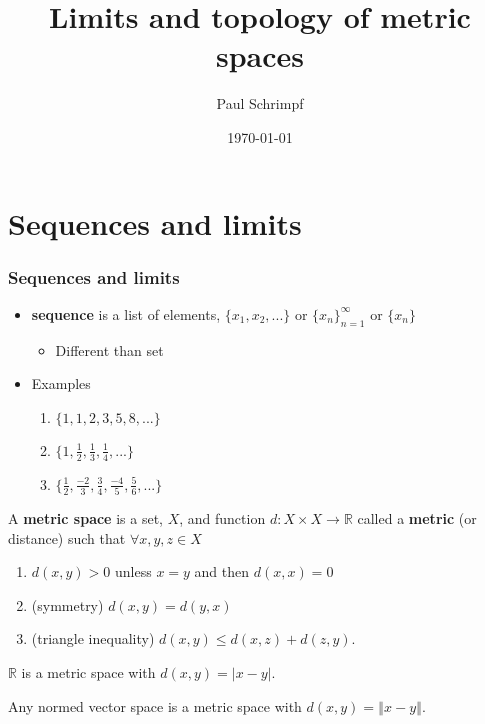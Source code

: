 \documentclass[compress]{beamer}
\title{Limits and topology of metric spaces}
\author{Paul Schrimpf}
\institute{UBC \\ Economics 526}
\date{\today}
\def\R{\mathbb{R}}
\newcommand{\norm}[1]{\left\Vert {#1} \right\Vert}
\newcommand{\seq}[1]{\{{#1}_n \}_{n=1}^\infty }
\begin{document}
\frame{\titlepage}

\begin{frame}
  \tableofcontents  
\end{frame}

\section{Sequences and limits}

\begin{frame}
  \frametitle{Sequences and limits}
  \begin{itemize}
  \item \textbf{sequence} is a list of elements, $\{x_1, x_2, ... \}$ or
    $\seq{x}$ or  $\{x_n\}$
    \begin{itemize}
    \item Different than set
    \end{itemize}
  \item Examples
    \begin{enumerate}
    \item\label{sfib} $\{ 1, 1, 2, 3, 5, 8, ... \}$
    \item\label{sc} $\{ 1, \frac{1}{2}, \frac{1}{3}, \frac{1}{4}, ... \}$
    \item\label{sd} $\{\frac{1}{2}, \frac{-2}{3}, \frac{3}{4}, \frac{-4}{5},
      \frac{5}{6}, ... \}$
    \end{enumerate}
  \end{itemize}
\end{frame}

\begin{frame}
  \begin{definition}
    A \textbf{metric space} is a set, $X$, and function $d:X\times X
    \rightarrow \R$ called a \textbf{metric} (or distance) such that
    $\forall x, y, z \in X$
    \begin{enumerate}
    \item $d(x,y) > 0$ unless $x=y$ and then $d(x,x) = 0$
    \item (symmetry) $d(x,y) = d(y,x)$
    \item (triangle inequality) $d(x,y) \leq d(x,z) + d(z,y)$.
    \end{enumerate}
  \end{definition}
  \begin{example}
    $\R$ is a metric space with $d(x,y) = |x - y|$. 
  \end{example}
  \begin{example}
    Any normed vector space is a metric space with $d(x,y) =
    \norm{x-y}$. 
  \end{example}
\end{frame}
\end{document}
